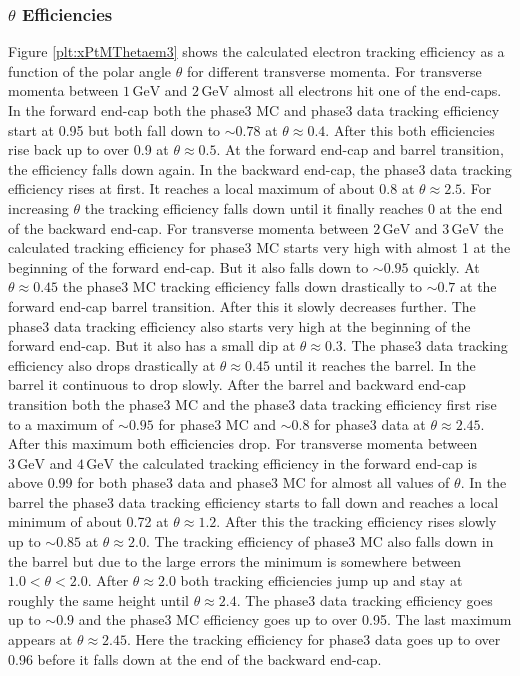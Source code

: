 \documentclass[a4paper,11pt,twosided,final,german,openbib,pdftex,listof=totoc,bibliography=totoc]{scrbook}
\begin{document}
\newpage

\subsubsection{$\theta$ Efficiencies}

Figure \ref{plt:xPtMThetaem3} shows the calculated electron tracking efficiency as a function of the polar angle $\theta$ for different transverse momenta.
For transverse momenta between $1\,\textrm{GeV}$ and $2\,\textrm{GeV}$ almost all electrons hit one of the end-caps. In the forward end-cap both the phase3 MC and phase3 data tracking efficiency start at 0.95 but both fall down to $\sim 0.78$ at $\theta \approx 0.4$. After this both efficiencies rise back up to over 0.9 at $\theta \approx 0.5$. At the forward end-cap and barrel transition, the efficiency falls down again. In the backward end-cap, the phase3 data tracking efficiency rises at first. It reaches a local maximum of about 0.8 at $\theta \approx 2.5$. For increasing $\theta$ the tracking efficiency falls down until it finally reaches 0 at the end of the backward end-cap.
For transverse momenta between $2\,\textrm{GeV}$ and $3\,\textrm{GeV}$ the calculated tracking efficiency for phase3 MC starts very high with almost 1 at the beginning of the forward end-cap. But it also falls down to $\sim 0.95$ quickly. At $\theta \approx 0.45$ the phase3 MC tracking efficiency falls down drastically to $\sim 0.7$ at the forward end-cap barrel transition. After this it slowly decreases further. The phase3 data tracking efficiency also starts very high at the beginning of the forward end-cap. But it also has a small dip at $\theta \approx 0.3$. The phase3 data tracking efficiency also drops drastically at $\theta \approx 0.45$ until it reaches the barrel. In the barrel it continuous to drop slowly. After the barrel and backward end-cap transition both the phase3 MC and the phase3 data tracking efficiency first rise to a maximum of $\sim 0.95$ for phase3 MC and $\sim 0.8$ for phase3 data at $\theta \approx 2.45$. After this maximum both efficiencies drop.
For transverse momenta between $3\,\textrm{GeV}$ and $4\,\textrm{GeV}$ the calculated tracking efficiency in the forward end-cap is above 0.99 for both phase3 data and phase3 MC for almost all values of $\theta$. In the barrel the phase3 data tracking efficiency starts to fall down and reaches a local minimum of about 0.72 at $\theta \approx 1.2$. After this the tracking efficiency rises slowly up to $\sim 0.85$ at $\theta \approx 2.0$. The tracking efficiency of phase3 MC also falls down in the barrel but due to the large errors the minimum is somewhere between $1.0 < \theta < 2.0$. After $\theta \approx 2.0$ both tracking efficiencies jump up and stay at roughly the same height until $\theta \approx 2.4$. The phase3 data tracking efficiency goes up to $\sim 0.9$ and the phase3 MC efficiency goes up to over 0.95. The last maximum appears at $\theta \approx 2.45$. Here the tracking efficiency for phase3 data goes up to over 0.96 before it  falls down at the end of the backward end-cap.
\end{document}
